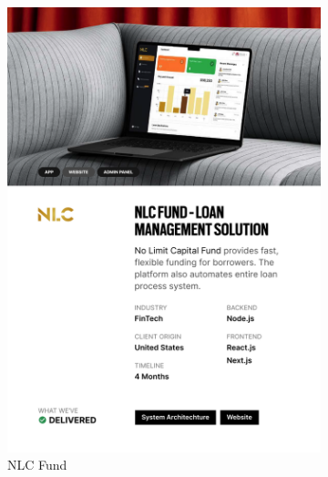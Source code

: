 \documentclass[12pt,a4paper]{report}
\begin{document}
\newpage
\begin{figure}[h!]
\centering
\begin{subfigure}[b]{0.43\textwidth}
    \centering
    \includegraphics[width=\textwidth]{Figures/nlc.png}
    \caption{NLC Fund}
\end{subfigure}
\hfill
\begin{subfigure}[b]{0.43\textwidth}
    \centering

\end{subfigure}
\end{figure}
\end{document}
